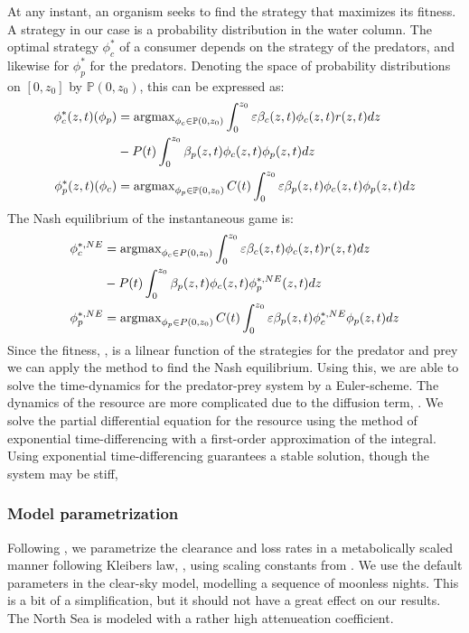 At any instant, an organism seeks to find the strategy that maximizes its fitness. A strategy in our case is a probability distribution in the water column. The optimal strategy $\phi_c^*$ of a consumer depends on the strategy of the predators, and likewise for $\phi_p^*$ for the predators. Denoting the space of probability distributions on $[0,z_0]$ by $\mathbb{P}(0,z_0)$, this can be expressed as:
\begin{align*}
	\phi_c^*(z,t)(\phi_p) &= \argmax_{\phi_c \in \mathbb{P}(0,z_0)}  \int_0^{z_0} \varepsilon \beta_c(z,t)\phi_c(z,t)r(z,t) dz \\ &- P(t)\int_0^{z_0} \beta_p(z,t) \phi_c(z,t) \phi_p(z,t)dz  \\
	\phi_p^*(z,t)(\phi_c) &= \argmax_{\phi_p \in \mathbb{P}(0,z_0)}C(t) \int_0^{z_0} \varepsilon \beta_p(z,t)\phi_c(z,t)\phi_p(z,t) dz
\end{align*}
The Nash equilibrium of the instantaneous game is:
\begin{align}
  \label{eq:nash_equilibria}
	\phi_c^{*,NE} &=  \argmax_{\phi_c \in P(0,z_0)}  \int_0^{z_0} \varepsilon \beta_c(z,t)\phi_c(z,t)r(z,t) dz \\ &- P(t)\int_0^{z_0} \beta_p(z,t) \phi_c(z,t) \phi_p^{*,NE}(z,t) dz \\
	\phi_p^{*,NE} &=  \argmax_{\phi_p \in P(0,z_0)}C(t) \int_0^{z_0} \varepsilon \beta_p(z,t)\phi_c^{*,NE} \phi_p(z,t) dz
\end{align}
Since the fitness, , is a lilnear function of the strategies for the predator and prey we can apply the method  to find the Nash equilibrium. Using this, we are able to solve the time-dynamics for the predator-prey system by a Euler-scheme. The dynamics of the resource are more complicated due to the diffusion term, . We solve the partial differential equation for the resource using the method of exponential time-differencing with a first-order approximation of the integral. Using exponential time-differencing guarantees a stable solution, though the system may be stiff, \cite{hochbruck2010exponential}

\subsubsection*{Model parametrization}
Following \citep{yodzis1992body}, we parametrize the clearance and loss rates in a metabolically scaled manner following Kleibers law, \citep{kleiber}, using scaling constants from \citep{kha_2019}. We use the default parameters in the clear-sky model, modelling a sequence of moonless nights. This is a bit of a simplification, but it should not have a great effect on our results. The North Sea is modeled with a rather high attenueation coefficient.


